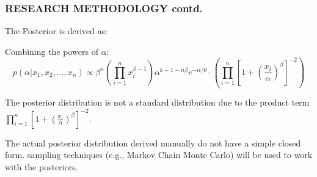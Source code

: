 \documentclass{beamer}
\begin{document}
\begin{frame}

\frametitle{RESEARCH METHODOLOGY contd.}

The Posterior is derived as:

Combining the powers of $\alpha$:
\[
p(\alpha | x_1, x_2, \ldots, x_n) \propto \beta^n \left( \prod_{i=1}^{n} x_i^{\beta-1} \right) \alpha^{k-1-n\beta} e^{-\alpha/\theta} \cdot \left( \prod_{i=1}^{n} \left[1 + \left(\frac{x_i}{\alpha}\right)^{\beta}\right]^{-2} \right)
\]

The posterior distribution is not a standard distribution due to the product term \( \prod_{i=1}^{n} \left[1 + \left(\frac{x_i}{\alpha}\right)^{\beta}\right]^{-2} \).

The actual posterior distribution derived manually do not have a simple closed form. sampling techniques (e.g., Markov Chain Monte Carlo) will be  used to work with the posteriors.


\end{frame}
\end{document}
